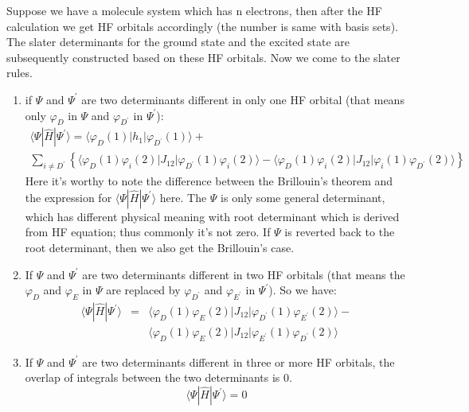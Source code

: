 Suppose we have a molecule system which has n electrons, then after
the HF calculation we get HF orbitals accordingly (the number is same
with basis sets). The slater determinants for the ground state and the
excited state are subsequently constructed based on these HF
orbitals. Now we come to the slater rules.

\begin{enumerate}
\item if $\Psi$ and $\Psi^{'}$ are two determinants different in only
  one HF orbital (that means only $\varphi_{D}$ in $\Psi$ and
  $\varphi_{D^{'}}$ in $\Psi^{'}$):
  \begin{multline}\label{CIeq:23}
    \langle \Psi|\hat{H}|\Psi^{'}\rangle =  \langle\varphi_{D}(1)|h_{1}|\varphi_{D^{'}}(1)\rangle +  \\
    \sum_{i \neq D^{'}} \left\{
      \langle\varphi_{D}(1)\varphi_{i}(2)|J_{12}|\varphi_{D^{'}}(1)\varphi_{i}(2)\rangle
      -
      \langle\varphi_{D}(1)\varphi_{i}(2)|J_{12}|\varphi_{i}(1)\varphi_{D^{'}}(2)\rangle
    \right\}
  \end{multline}
  Here it's worthy to note the difference between the Brillouin's
  theorem and the expression for $\langle
  \Psi|\hat{H}|\Psi^{'}\rangle$ here. The $\Psi$ is only some
  general determinant, which has different physical meaning with root
  determinant which is derived from HF equation; thus commonly it's not zero. If
  $\Psi$ is reverted back to the root determinant, then we also get the
  Brillouin's case.

\item If $\Psi$ and $\Psi^{'}$ are two determinants different in two
  HF orbitals (that means the $\varphi_{D}$ and $\varphi_{E}$ in
  $\Psi$ are replaced by $\varphi_{D^{'}}$ and $\varphi_{E^{'}}$ in
  $\Psi^{'}$). So we have:
  \begin{eqnarray}\label{CIeq:24}
    \langle \Psi|\hat{H}|\Psi^{'}\rangle &=& \langle\varphi_{D}(1)\varphi_{E}(2)|J_{12}|\varphi_{D^{'}}(1)\varphi_{E^{'}}(2)\rangle
    - \nonumber \\
    & & \langle\varphi_{D}(1)\varphi_{E}(2)|J_{12}|\varphi_{E^{'}}(1)\varphi_{D^{'}}(2)\rangle
  \end{eqnarray}

\item If $\Psi$ and $\Psi^{'}$ are two determinants different in three
  or more HF orbitals, the overlap of integrals between the two
  determinants is 0.
  \begin{equation}\label{CIeq:25}
    \langle \Psi|\hat{H}|\Psi^{'}\rangle = 0
  \end{equation}

\end{enumerate}

